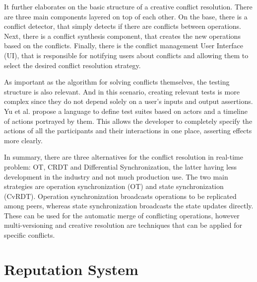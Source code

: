 It further elaborates on the basic structure of a creative conflict resolution. There are three main components layered on top of each other. On the base, there is a conflict detector, that simply detects if there are conflicts between operations. Next, there is a conflict synthesis component, that creates the new operations based on the conflicts. Finally, there is the conflict management User Interface (UI), that is responsible for notifying users about conflicts and allowing them to select the desired conflict resolution strategy.

As important as the algorithm for solving conflicts themselves, the testing structure is also relevant. And in this scenario, creating relevant tests is more complex since they do not depend solely on a user's inputs and output assertions. Yu et al. \cite{Yu2007} propose a language to define test suites based on actors and a timeline of actions portrayed by them. This allows the developer to completely specify the actions of all the participants and their interactions in one place, asserting effects more clearly.

In summary, there are three alternatives for the conflict resolution in real-time problem: OT, CRDT and Differential Synchronization, the latter having less development in the industry and not much production use. The two main strategies are operation synchronization (OT) and state synchronization (CvRDT). Operation synchronization broadcasts operations to be replicated among peers, whereas state synchronization broadcasts the state updates directly. These can be used for the automatic merge of conflicting operations, however multi-versioning and creative resolution are techniques that can be applied for specific conflicts.

\section{Reputation System}\label{sec:rep-sys-sota}

